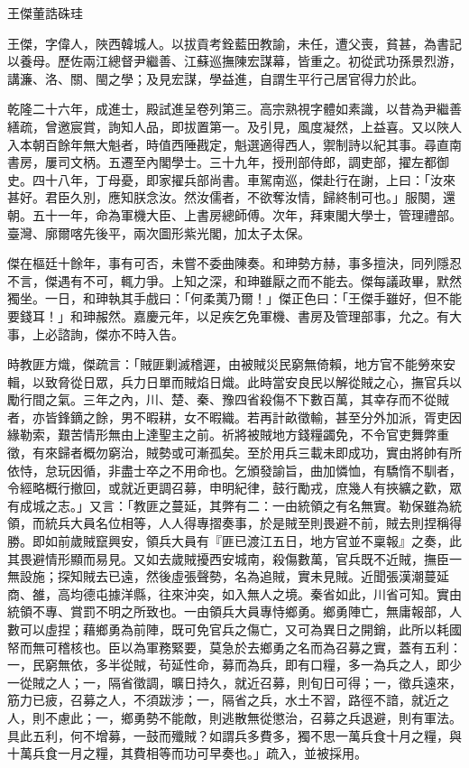 
\begin{pinyinscope}
王傑董誥硃珪

王傑，字偉人，陜西韓城人。以拔貢考銓藍田教諭，未任，遭父喪，貧甚，為書記以養母。歷佐兩江總督尹繼善、江蘇巡撫陳宏謀幕，皆重之。初從武功孫景烈游，講濂、洛、關、閩之學；及見宏謀，學益進，自謂生平行己居官得力於此。

乾隆二十六年，成進士，殿試進呈卷列第三。高宗熟視字體如素識，以昔為尹繼善繕疏，曾邀宸賞，詢知人品，即拔置第一。及引見，風度凝然，上益喜。又以陜人入本朝百餘年無大魁者，時值西陲戡定，魁選適得西人，禦制詩以紀其事。尋直南書房，屢司文柄。五遷至內閣學士。三十九年，授刑部侍郎，調吏部，擢左都御史。四十八年，丁母憂，即家擢兵部尚書。車駕南巡，傑赴行在謝，上曰：「汝來甚好。君臣久別，應知朕念汝。然汝儒者，不欲奪汝情，歸終制可也。」服闋，還朝。五十一年，命為軍機大臣、上書房總師傅。次年，拜東閣大學士，管理禮部。臺灣、廓爾喀先後平，兩次圖形紫光閣，加太子太保。

傑在樞廷十餘年，事有可否，未嘗不委曲陳奏。和珅勢方赫，事多擅決，同列隱忍不言，傑遇有不可，輒力爭。上知之深，和珅雖厭之而不能去。傑每議政畢，默然獨坐。一日，和珅執其手戲曰：「何柔荑乃爾！」傑正色曰：「王傑手雖好，但不能要錢耳！」和珅赧然。嘉慶元年，以足疾乞免軍機、書房及管理部事，允之。有大事，上必諮詢，傑亦不時入告。

時教匪方熾，傑疏言：「賊匪剿滅稽遲，由被賊災民窮無倚賴，地方官不能勞來安輯，以致脅從日眾，兵力日單而賊焰日熾。此時當安良民以解從賊之心，撫官兵以勵行間之氣。三年之內，川、楚、秦、豫四省殺傷不下數百萬，其幸存而不從賊者，亦皆鋒鏑之餘，男不暇耕，女不暇織。若再計畝徵輸，甚至分外加派，胥吏因緣勒索，艱苦情形無由上達聖主之前。祈將被賊地方錢糧蠲免，不令官吏舞弊重徵，有來歸者概勿窮治，賊勢或可漸孤矣。至於用兵三載未即成功，實由將帥有所依恃，怠玩因循，非盡士卒之不用命也。乞頒發諭旨，曲加憐恤，有驕惰不馴者，令經略概行撤回，或就近更調召募，申明紀律，鼓行勵戎，庶幾人有挾纊之歡，眾有成城之志。」又言：「教匪之蔓延，其弊有二：一由統領之有名無實。勒保雖為統領，而統兵大員名位相等，人人得專摺奏事，於是賊至則畏避不前，賊去則捏稱得勝。即如前歲賊竄興安，領兵大員有『匪已渡江五日，地方官並不稟報』之奏，此其畏避情形顯而易見。又如去歲賊擾西安城南，殺傷數萬，官兵既不近賊，撫臣一無設施；探知賊去已遠，然後虛張聲勢，名為追賊，實未見賊。近聞張漢潮蔓延商、雒，高均德屯據洋縣，往來沖突，如入無人之境。秦省如此，川省可知。實由統領不專、賞罰不明之所致也。一由領兵大員專恃鄉勇。鄉勇陣亡，無庸報部，人數可以虛捏；藉鄉勇為前陣，既可免官兵之傷亡，又可為異日之開銷，此所以耗國帑而無可稽核也。臣以為軍務緊要，莫急於去鄉勇之名而為召募之實，蓋有五利：一，民窮無依，多半從賊，茍延性命，募而為兵，即有口糧，多一為兵之人，即少一從賊之人；一，隔省徵調，曠日持久，就近召募，則旬日可得；一，徵兵遠來，筋力已疲，召募之人，不須跋涉；一，隔省之兵，水土不習，路徑不諳，就近之人，則不慮此；一，鄉勇勢不能敵，則逃散無從懲治，召募之兵退避，則有軍法。具此五利，何不增募，一鼓而殲賊？如謂兵多費多，獨不思一萬兵食十月之糧，與十萬兵食一月之糧，其費相等而功可早奏也。」疏入，並被採用。


\end{pinyinscope}
